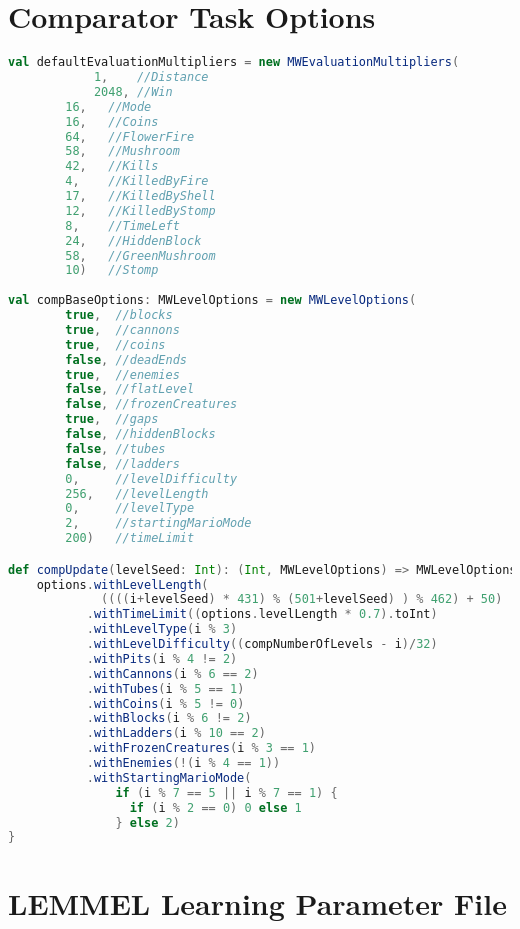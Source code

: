 \section{Comparator Task Options}
\label{app:comptask}
\setcounter{lstlisting}{0}


\begin{minipage}{0.9\linewidth}
\begin{lstlisting}[language=scala, basicstyle=\scriptsize\ttfamily, caption=Parameter classes for the comparator task described in Section \ref{subsec:comptask}]
val defaultEvaluationMultipliers = new MWEvaluationMultipliers(
        	1,    //Distance
        	2048, //Win
		16,   //Mode
		16,   //Coins
		64,   //FlowerFire
		58,   //Mushroom
		42,   //Kills
		4,    //KilledByFire
		17,   //KilledByShell
		12,   //KilledByStomp
		8,    //TimeLeft
		24,   //HiddenBlock
		58,   //GreenMushroom
		10)   //Stomp
		
val compBaseOptions: MWLevelOptions = new MWLevelOptions(
		true,  //blocks
		true,  //cannons
		true,  //coins
		false, //deadEnds
		true,  //enemies
		false, //flatLevel
		false, //frozenCreatures
		true,  //gaps
		false, //hiddenBlocks
		false, //tubes
		false, //ladders
		0,     //levelDifficulty
		256,   //levelLength
		0,     //levelType
		2,     //startingMarioMode
		200)   //timeLimit

def compUpdate(levelSeed: Int): (Int, MWLevelOptions) => MWLevelOptions = (i: Int, options: MWLevelOptions) => {
    options.withLevelLength(
             ((((i+levelSeed) * 431) % (501+levelSeed) ) % 462) + 50)
           .withTimeLimit((options.levelLength * 0.7).toInt)
           .withLevelType(i % 3)
           .withLevelDifficulty((compNumberOfLevels - i)/32)
           .withPits(i % 4 != 2)
           .withCannons(i % 6 == 2)
           .withTubes(i % 5 == 1)
           .withCoins(i % 5 != 0)
           .withBlocks(i % 6 != 2)
           .withLadders(i % 10 == 2)
           .withFrozenCreatures(i % 3 == 1)
           .withEnemies(!(i % 4 == 1))
           .withStartingMarioMode(
               if (i % 7 == 5 || i % 7 == 1) {
                 if (i % 2 == 0) 0 else 1
               } else 2)
}
\end{lstlisting}
\end{minipage}


\section{LEMMEL Learning Parameter File}
\label{app:paramfile}

